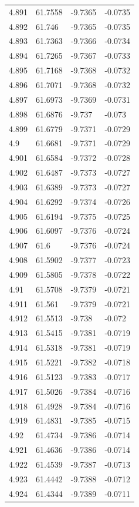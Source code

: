 \begin{tabular}{llll}
4.891 & 61.7558 & -9.7365 & -0.0735 \\
4.892 & 61.746 & -9.7365 & -0.0735 \\
4.893 & 61.7363 & -9.7366 & -0.0734 \\
4.894 & 61.7265 & -9.7367 & -0.0733 \\
4.895 & 61.7168 & -9.7368 & -0.0732 \\
4.896 & 61.7071 & -9.7368 & -0.0732 \\
4.897 & 61.6973 & -9.7369 & -0.0731 \\
4.898 & 61.6876 & -9.737 & -0.073 \\
4.899 & 61.6779 & -9.7371 & -0.0729 \\
4.9 & 61.6681 & -9.7371 & -0.0729 \\
4.901 & 61.6584 & -9.7372 & -0.0728 \\
4.902 & 61.6487 & -9.7373 & -0.0727 \\
4.903 & 61.6389 & -9.7373 & -0.0727 \\
4.904 & 61.6292 & -9.7374 & -0.0726 \\
4.905 & 61.6194 & -9.7375 & -0.0725 \\
4.906 & 61.6097 & -9.7376 & -0.0724 \\
4.907 & 61.6 & -9.7376 & -0.0724 \\
4.908 & 61.5902 & -9.7377 & -0.0723 \\
4.909 & 61.5805 & -9.7378 & -0.0722 \\
4.91 & 61.5708 & -9.7379 & -0.0721 \\
4.911 & 61.561 & -9.7379 & -0.0721 \\
4.912 & 61.5513 & -9.738 & -0.072 \\
4.913 & 61.5415 & -9.7381 & -0.0719 \\
4.914 & 61.5318 & -9.7381 & -0.0719 \\
4.915 & 61.5221 & -9.7382 & -0.0718 \\
4.916 & 61.5123 & -9.7383 & -0.0717 \\
4.917 & 61.5026 & -9.7384 & -0.0716 \\
4.918 & 61.4928 & -9.7384 & -0.0716 \\
4.919 & 61.4831 & -9.7385 & -0.0715 \\
4.92 & 61.4734 & -9.7386 & -0.0714 \\
4.921 & 61.4636 & -9.7386 & -0.0714 \\
4.922 & 61.4539 & -9.7387 & -0.0713 \\
4.923 & 61.4442 & -9.7388 & -0.0712 \\
4.924 & 61.4344 & -9.7389 & -0.0711 \\

\end{tabular}
